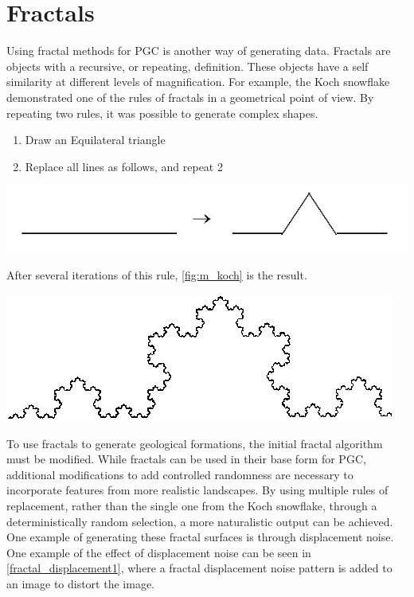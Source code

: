 \documentclass[10pt]{report}
\begin{document}
		\section{Fractals} \label{sec:fractal}
			Using fractal methods for PGC is another way of generating data. Fractals are objects with a recursive, or repeating, definition. These objects have a self similarity at different levels of magnification. For example, the Koch snowflake demonstrated one of the rules of fractals in a geometrical point of view. By repeating two rules, it was possible to generate complex shapes.
			
			\begin{enumerate}
				\item Draw an Equilateral triangle
				\item Replace all lines as follows, and repeat 2
			\end{enumerate}
		
			\begin{minipage}{\textwidth}
				\centering
				\includegraphics[scale=0.5]{m_reprule}
				\label{fig:m_reprule}
			\end{minipage}
		
			After several iterations of this rule, \autoref{fig:m_koch} is the result.
			
			\begin{minipage}{\textwidth}
				\centering
				\includegraphics[scale=0.5]{m_koch}
				\label{fig:m_koch}
			\end{minipage}
			
			To use fractals to generate geological formations, the initial fractal algorithm must be modified. While fractals can be used in their base form for PGC, additional modifications to add controlled randomness are necessary to incorporate features from more realistic landscapes. By using multiple rules of replacement, rather than the single one from the Koch snowflake, through a deterministically random selection, a more naturalistic output can be achieved. One example of generating these fractal surfaces is through displacement noise. One example of the effect of displacement noise can be seen in \autoref{fractal_displacement1}, where a fractal displacement noise pattern is added to an image to distort the image. 
			
\end{document}

